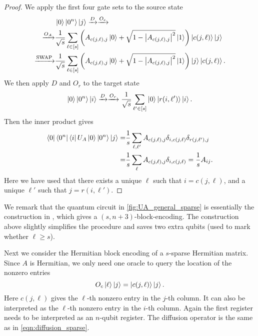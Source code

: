 \begin{proof}
We apply the first four gate sets to the source state
\begin{equation}
\begin{split}
&\ket{0}\ket{0^n}\ket{j}\xrightarrow{D}\xrightarrow{O_c}\\
\xrightarrow{O_A}& \frac{1}{\sqrt{s}}\sum_{\ell\in[s]} \left(A_{c(j,\ell),j}\ket{0}+\sqrt{1-\left\lvert A_{c(j,\ell),j}\right\rvert^2}\ket{1}\right)\ket{c(j,\ell)}\ket{j}\\
\xrightarrow{\operatorname{SWAP}}& \frac{1}{\sqrt{s}}\sum_{\ell\in[s]} \left(A_{c(j,\ell),j}\ket{0}+\sqrt{1-\left\lvert A_{c(j,\ell),j}\right\rvert^2}\ket{1}\right)\ket{j}\ket{c(j,\ell)}.
\end{split}
\end{equation}
We then apply $D$ and $O_r$ to the target state
\begin{equation}
\ket{0}\ket{0^n}\ket{i}\xrightarrow{D}\xrightarrow{O_r}\frac{1}{\sqrt{s}}\sum_{\ell'\in[s]} \ket{0}\ket{r(i,\ell')}\ket{i}.
\end{equation}
Then the inner product gives
\begin{equation}
\begin{split}
\bra{0}\bra{0^n}\bra{i}U_A\ket{0}\ket{0^n}\ket{j}=&
\frac{1}{s}\sum_{\ell,\ell'} A_{c(j,\ell),j}\delta_{i,c(j,\ell)}\delta_{r(j,\ell'),j}\\
=&\frac{1}{s}\sum_{\ell} A_{c(j,\ell),j}\delta_{i,c(j,\ell)}=\frac{1}{s}A_{ij}.
\end{split}
\end{equation}
Here we have used that there exists a unique $\ell$ such that $i=c(j,\ell)$, and a unique $\ell'$ such that $j=r(i,\ell')$.
\end{proof}

We remark that the quantum circuit in \cref{fig:UA_general_sparse} is essentially the construction in \cite[Lemma 48]{GilyenSuLowEtAl2018}, which gives a $(s,n+3)$-block-encoding. The construction above slightly simplifies the procedure and saves two extra qubits (used to mark whether $\ell\ge s$). 



Next we consider the Hermitian block encoding of a $s$-sparse Hermitian matrix.
Since $A$ is Hermitian, we only need one oracle to query the location of the nonzero entries
\begin{equation}
O_c\ket{\ell}\ket{j}=\ket{c(j,\ell)}\ket{j}.
\end{equation}
Here $c(j,\ell)$ gives the $\ell$-th nonzero entry in the $j$-th column.
It can also be interpreted as the $\ell$-th nonzero entry in the $i$-th column.
Again the first register needs to be interpreted as an $n$-qubit register.
The diffusion operator is the same as in \cref{eqn:diffusion_sparse}.

